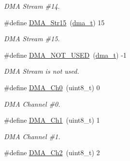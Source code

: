 \begin{DoxyCompactItemize}
\begin{DoxyCompactList}\small\item\em D\+M\+A Stream \#14. \end{DoxyCompactList}\item 
\hypertarget{group___d_m_a___h_a_l_ga6df87ce1f4eb51573acbfdbef87cf883}{\#define \hyperlink{group___d_m_a___h_a_l_ga6df87ce1f4eb51573acbfdbef87cf883}{D\+M\+A\+\_\+\+Str15}~(\hyperlink{group___d_m_a___h_a_l_ga15fec033c1f956ff5c0dab218a0c7030}{dma\+\_\+t}) 15}\label{group___d_m_a___h_a_l_ga6df87ce1f4eb51573acbfdbef87cf883}

\begin{DoxyCompactList}\small\item\em D\+M\+A Stream \#15. \end{DoxyCompactList}\item 
\hypertarget{group___d_m_a___h_a_l_ga13c84ec1a2d5cf258f4ddd534e2bf071}{\#define \hyperlink{group___d_m_a___h_a_l_ga13c84ec1a2d5cf258f4ddd534e2bf071}{D\+M\+A\+\_\+\+N\+O\+T\+\_\+\+U\+S\+E\+D}~(\hyperlink{group___d_m_a___h_a_l_ga15fec033c1f956ff5c0dab218a0c7030}{dma\+\_\+t}) -\/1}\label{group___d_m_a___h_a_l_ga13c84ec1a2d5cf258f4ddd534e2bf071}

\begin{DoxyCompactList}\small\item\em D\+M\+A Stream is not used. \end{DoxyCompactList}\item 
\hypertarget{group___d_m_a___h_a_l_ga9facb8b7f9092f6a5e3869eb1d69bbbf}{\#define \hyperlink{group___d_m_a___h_a_l_ga9facb8b7f9092f6a5e3869eb1d69bbbf}{D\+M\+A\+\_\+\+Ch0}~(uint8\+\_\+t) 0}\label{group___d_m_a___h_a_l_ga9facb8b7f9092f6a5e3869eb1d69bbbf}

\begin{DoxyCompactList}\small\item\em D\+M\+A Channel \#0. \end{DoxyCompactList}\item 
\hypertarget{group___d_m_a___h_a_l_gaa0edb371f2c40bb9df2827e0d5bb7374}{\#define \hyperlink{group___d_m_a___h_a_l_gaa0edb371f2c40bb9df2827e0d5bb7374}{D\+M\+A\+\_\+\+Ch1}~(uint8\+\_\+t) 1}\label{group___d_m_a___h_a_l_gaa0edb371f2c40bb9df2827e0d5bb7374}

\begin{DoxyCompactList}\small\item\em D\+M\+A Channel \#1. \end{DoxyCompactList}\item 
\hypertarget{group___d_m_a___h_a_l_ga9331d296162701d808245cb1c10f23b4}{\#define \hyperlink{group___d_m_a___h_a_l_ga9331d296162701d808245cb1c10f23b4}{D\+M\+A\+\_\+\+Ch2}~(uint8\+\_\+t) 2}\label{group___d_m_a___h_a_l_ga9331d296162701d808245cb1c10f23b4}


\end{DoxyCompactItemize}
